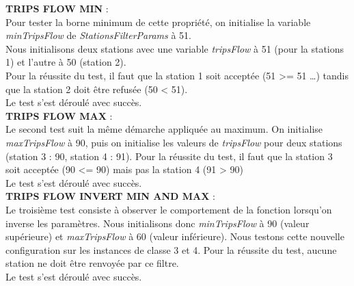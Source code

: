 \documentclass[12pt]{article}
\begin{document}
		\textbf{TRIPS FLOW MIN} :\\
		Pour tester la borne minimum de cette propriété, on initialise la variable \textit{minTripsFlow} de \textit{StationsFilterParams} à 51.\\
		Nous initialisons deux stations avec une variable \textit{tripsFlow} à 51 (pour la stations 1) et l’autre à 50 (station 2).\\
		Pour la réussite du test, il faut que la station 1 soit acceptée (51 >= 51 …) tandis que la station 2 doit être refusée (50 < 51).\\

		Le test s’est déroulé avec succès.\\


		\textbf{TRIPS FLOW MAX} :\\
		Le second test suit la même démarche appliquée au maximum. On initialise \textit{maxTripsFlow} à 90, puis on initialise les valeurs de \textit{tripsFlow} pour deux stations (station 3 : 90, station 4 : 91). Pour la réussite du test, il faut que la station 3 soit acceptée (90 <= 90) mais pas la station 4 (91 > 90)\\

		Le test s’est déroulé avec succès.\\


		\textbf{TRIPS FLOW INVERT MIN AND MAX} :\\
		Le troisième test consiste à observer le comportement de la fonction lorsqu’on inverse les paramètres. Nous initialisons donc \textit{minTripsFlow} à 90 (valeur supérieure) et \textit{maxTripsFlow} à 60 (valeur inférieure). Nous testons cette nouvelle configuration sur les instances de classe 3 et 4. Pour la réussite du test, aucune station ne doit être renvoyée par ce filtre.\\
	
	Le test s’est déroulé avec succès.
	
\end{document}
